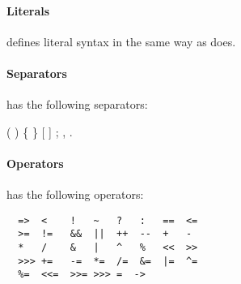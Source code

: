\paragraph{Literals}\label{Literals}

\XtenCurrVer{} defines literal syntax in the same way as \java{} does.

\paragraph{Separators}
\Xten{} has the following separators:
\begin{x10}
(	)	\{	\}	[  ]	; ,	.
\end{x10}

\paragraph{Operators}
\Xten{} has the following operators:
{\footnotesize
\begin{verbatim}
  =>  <    !   ~   ?   :   ==  <=  
  >=  !=   &&  ||  ++  --  +   - 
  *   /    &   |   ^   %   <<  >> 
  >>> +=   -=  *=  /=  &=  |=  ^=  
  %=  <<=  >>= >>> =  ->
\end{verbatim}}




